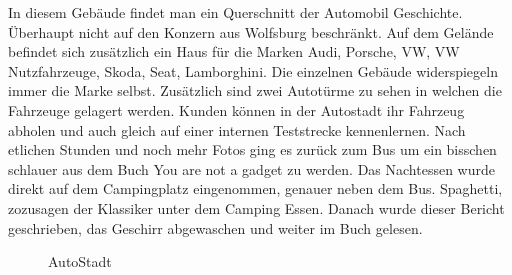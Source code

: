 In diesem Gebäude findet man ein Querschnitt der Automobil Geschichte.
Überhaupt nicht auf den Konzern aus Wolfsburg beschränkt.
Auf dem Gelände befindet sich zusätzlich ein Haus für die Marken Audi, Porsche, VW, VW Nutzfahrzeuge, Skoda, Seat, Lamborghini.
Die einzelnen Gebäude widerspiegeln immer die Marke selbst. 
Zusätzlich sind zwei Autotürme zu sehen in welchen die Fahrzeuge gelagert werden.
Kunden können in der Autostadt ihr Fahrzeug abholen und auch gleich auf einer internen Teststrecke kennenlernen.
Nach etlichen Stunden und noch mehr Fotos ging es zurück zum Bus um ein bisschen schlauer aus dem Buch \glqq You are not a gadget\grqq{} zu werden.
Das Nachtessen wurde direkt auf dem Campingplatz eingenommen, genauer neben dem Bus.
Spaghetti, zozusagen der Klassiker unter dem Camping Essen.
Danach wurde dieser Bericht geschrieben, das Geschirr abgewaschen und weiter im Buch gelesen.

\begin{figure}[H]
   \centering
   \quad
   \quad
   \quad
   \caption[AutoStadt]{AutoStadt}
\end{figure}


